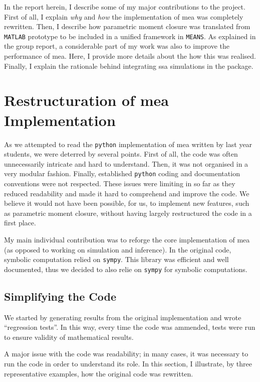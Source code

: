 \documentclass[11pt,a4paper]{article}
\newcommand{\means}{\texttt{MEANS}}
\newcommand{\py}{\texttt{python}}
\newcommand{\sympy}{\texttt{sympy}}
\newcommand{\mat}{\texttt{MATLAB}}
\newcommand{\citationneeded}[2][]{\todo[color=brown, fancyline, #1]{\textbf{Citation Needed:} #2}}
\begin{document}
In the report herein, I describe some of my major contributions to the project. 
First of all, I explain \emph{why} and \emph{how} the implementation of \acrlong{mea} was completely rewritten.
Then, I describe how parametric moment closure was translated from \mat{} prototype to be included in a unified framework in \means.
As explained in the group report, a considerable part of my work was also to improve the performance of \gls{mea}.
Here, I provide more details about the how this was realised.  
Finally, I explain the rationale behind integrating \acrlong{ssa} simulations in the package. 

\section{Restructuration of \acrlong{mea} Implementation}
As we attempted to read the \py{} implementation of \acrshort{mea} written by last year students\cite{babtie_moment_2013},
we were deterred by several points.
First of all, the code was often unnecessarily intricate and hard to understand.
Then, it was not organised in a very modular fashion.
Finally, established \py{} coding and documentation conventions\cite{_pep_????} were not respected.
These issues were limiting in so far as they reduced readability and made it hard to comprehend and improve the code.
We believe it would not have been possible, for us, to implement new features, such as parametric moment closure,
without having largely restructured the code in a first place.

My main individual contribution was to reforge the core implementation of \acrshort{mea} (as opposed to working on simulation and inference).
In the original code, symbolic computation relied on \sympy{}\citationneeded{}.
This library was efficient and well documented, thus we decided to also relie on \sympy{} for symbolic computations.
 
\subsection{Simplifying the Code}
We started by generating results from the original implementation and wrote ``regression tests''.
In this way, every time the code was ammended, tests were run to ensure validity of mathematical results.

A major issue with the code was readability; in many cases, it was necessary to run the code in order to understand its role.
In this section, I illustrate, by three representative examples, how the original code was rewritten.
\end{document}

